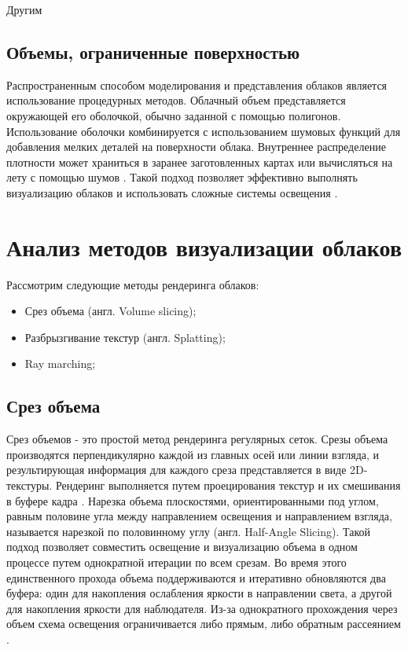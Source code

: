 Другим  

\subsection{Объемы, ограниченные поверхностью} 
\label{partmediaref}
Распространенным способом моделирования и представления облаков является использование процедурных методов. Облачный объем представляется окружающей его оболочкой, обычно заданной с помощью полигонов. Использование оболочки комбинируется с использованием шумовых функций для добавления мелких деталей на поверхности облака. Внутреннее распределение плотности может храниться в заранее заготовленных картах или вычисляться на лету с помощью шумов \cite{frostbite}. Такой подход позволяет эффективно выполнять визуализацию облаков и использовать сложные системы освещения \cite{clouds}. 


\section{Анализ методов визуализации облаков}

Рассмотрим следующие методы рендеринга облаков:

\begin{itemize}
	\item Срез объема (англ. Volume slicing);
	\item Разбрызгивание текстур (англ. Splatting);
	\item Ray marching;
\end{itemize}


\subsection{Срез объема}
\label{slice}
Срез объемов - это простой метод рендеринга регулярных сеток. Срезы объема производятся перпендикулярно каждой из главных осей или линии взгляда, и результирующая информация для каждого среза представляется в виде 2D-текстуры. Рендеринг выполняется путем проецирования текстур и их смешивания в буфере кадра \cite{vs}. Нарезка объема плоскостями, ориентированными под углом, равным половине угла между направлением освещения и направлением взгляда, называется нарезкой по половинному углу (англ. Half-Angle Slicing). Такой подход позволяет совместить освещение и визуализацию объема в одном процессе путем однократной итерации по всем срезам. Во время этого единственного прохода объема поддерживаются и итеративно обновляются два буфера: один для накопления ослабления яркости в направлении света, а другой для накопления яркости для наблюдателя. Из-за однократного прохождения через объем схема освещения ограничивается либо прямым, либо обратным рассеянием \cite{clouds}. 

